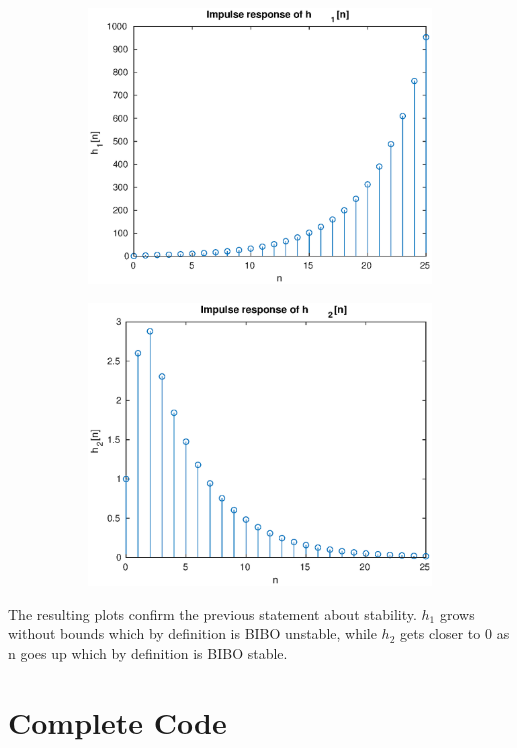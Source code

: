 \documentclass{article}
\begin{document}
\begin{figure}[H]
	\centering
	\begin{subfigure}[b]{0.4\linewidth}
		\centering
		\includegraphics[width=\linewidth]{imph1}
	\end{subfigure}
	\begin{subfigure}[b]{0.4\linewidth}
		\centering
		\includegraphics[width=\linewidth]{imph2}
	\end{subfigure}
\end{figure}

The resulting plots confirm the previous statement about stability. \(h_1\) grows without bounds which by definition is BIBO unstable, while \(h_2\) gets closer to 0 as n goes up which by definition is BIBO stable.
\pagebreak
\appendix
\section{Complete Code}
\inputminted{Matlab}{lab3.m}
\end{document}
